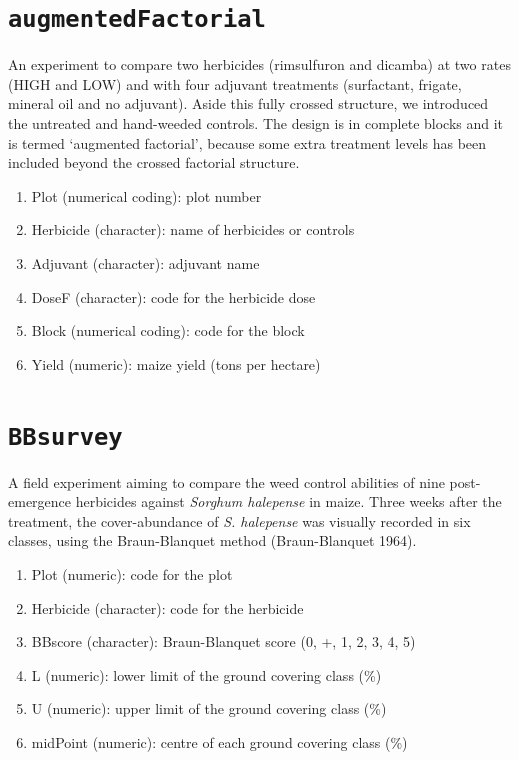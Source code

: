 \documentclass[
  letterpaper,
  DIV=11,
  numbers=noendperiod]{scrreprt}
\providecommand{\tightlist}{%
  \setlength{\itemsep}{0pt}\setlength{\parskip}{0pt}}
\begin{document}
\section*{\texorpdfstring{\texttt{augmentedFactorial}}{augmentedFactorial}}\label{augmentedFactorial}


An experiment to compare two herbicides (rimsulfuron and dicamba) at two
rates (HIGH and LOW) and with four adjuvant treatments (surfactant,
frigate, mineral oil and no adjuvant). Aside this fully crossed
structure, we introduced the untreated and hand-weeded controls. The
design is in complete blocks and it is termed `augmented factorial',
because some extra treatment levels has been included beyond the crossed
factorial structure.

\begin{enumerate}
\def\labelenumi{\arabic{enumi}.}
\tightlist
\item
  Plot (numerical coding): plot number
\item
  Herbicide (character): name of herbicides or controls
\item
  Adjuvant (character): adjuvant name
\item
  DoseF (character): code for the herbicide dose
\item
  Block (numerical coding): code for the block
\item
  Yield (numeric): maize yield (tons per hectare)
\end{enumerate}

\section*{\texorpdfstring{\texttt{BBsurvey}}{BBsurvey}}\label{BBsurvey}


A field experiment aiming to compare the weed control abilities of nine
post-emergence herbicides against \emph{Sorghum halepense} in maize.
Three weeks after the treatment, the cover-abundance of \emph{S.
halepense} was visually recorded in six classes, using the
Braun-Blanquet method (Braun-Blanquet 1964).

\begin{enumerate}
\def\labelenumi{\arabic{enumi}.}
\tightlist
\item
  Plot (numeric): code for the plot
\item
  Herbicide (character): code for the herbicide
\item
  BBscore (character): Braun-Blanquet score (0, +, 1, 2, 3, 4, 5)
\item
  L (numeric): lower limit of the ground covering class (\%)
\item
  U (numeric): upper limit of the ground covering class (\%)
\item
  midPoint (numeric): centre of each ground covering class (\%)
\end{enumerate}
\end{document}
